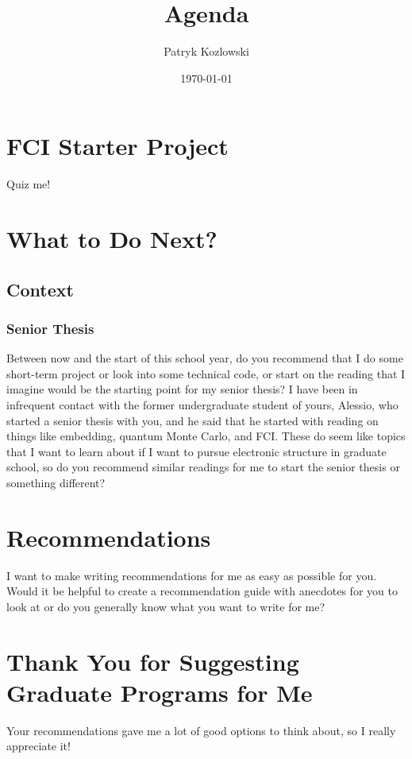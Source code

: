 \documentclass[12pt]{article}
\title{Agenda}
\author{Patryk Kozlowski}
\date{\today}
\begin{document}
\maketitle

\section{FCI Starter Project}
Quiz me!

\section{What to Do Next?} 

\subsection{Context}

\subsubsection{Senior Thesis}
Between now and the start of this school year, do you recommend that I do some short-term project or look into some technical code, or start on the reading that I imagine would be the starting point for my senior thesis? I have been in infrequent contact with the former undergraduate student of yours, Alessio, who started a senior thesis with you, and he said that he started with reading on things like embedding, quantum Monte Carlo, and FCI. These do seem like topics that I want to learn about if I want to pursue electronic structure in graduate school, so do you recommend similar readings for me to start the senior thesis or something different?




\section{Recommendations}
I want to make writing recommendations for me as easy as possible for you. Would it be helpful to create a recommendation guide with anecdotes for you to look at or do you generally know what you want to write for me?

\section{Thank You for Suggesting Graduate Programs for Me}
Your recommendations gave me a lot of good options to think about, so I really appreciate it!
\end{document}
